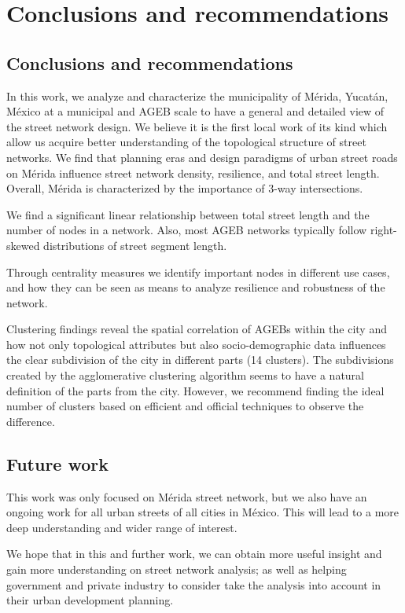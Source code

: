 \chapter{Conclusions and recommendations}
\label{cha:conclusions}
\section{Conclusions and recommendations}

In this work, we analyze and characterize the municipality of Mérida, Yucatán, México at a municipal and AGEB scale to have a general and detailed view of the street network design. We believe it is the first local work of its kind which allow us acquire better understanding of the topological structure of street networks. We find that planning eras and design paradigms of urban street roads on Mérida influence street network density, resilience, and total street length. Overall, Mérida is characterized by the importance of 3-way intersections. 

We find a significant linear relationship between total street length and the number of nodes in a network. Also, most AGEB networks typically follow right-skewed distributions of street segment length.

Through centrality measures we identify important nodes in different use cases, and how they can be seen as means to analyze resilience and robustness of the network. 

Clustering findings reveal the spatial correlation of AGEBs within the city and how not only topological attributes but also socio-demographic data influences the clear subdivision of the city in different parts (14 clusters). The subdivisions created by the agglomerative clustering algorithm seems to have a natural definition of the parts from the city. However, we recommend finding the ideal number of clusters based on efficient and official techniques to observe the difference.


\section{Future work}

This work was only focused on Mérida street network, but we also have an ongoing work for all urban streets of all cities in México. This will lead to a more deep understanding and wider range of interest.

We hope that in this and further work, we can obtain more useful insight and gain more understanding on street network analysis; as well as helping government and private industry to consider take the analysis into account in their urban development planning.